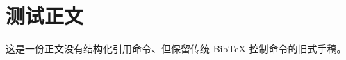 \documentclass[UTF8]{ctexart}
\begin{document}
\section*{测试正文}

这是一份正文没有结构化引用命令、但保留传统 BibTeX 控制命令的旧式手稿。



\end{document}
